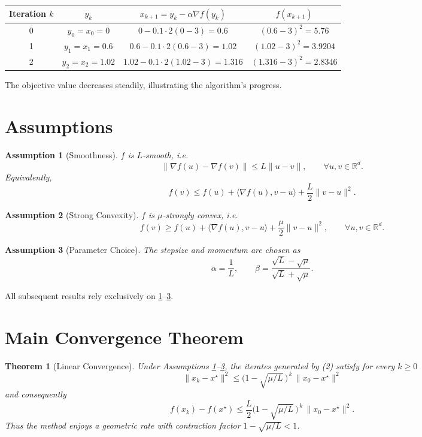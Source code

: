 \documentclass{article}
\newtheorem{theorem}{Theorem}
\newtheorem{assumption}{Assumption}
\begin{document}
\begin{center}
\begin{tabular}{c|c|c|c}
Iteration $k$ & $y_k$ & $x_{k+1}=y_k-\alpha\nabla f(y_k)$ & $f(x_{k+1})$ \\ \hline
0 & $y_0=x_0=0$ & $0-0.1\cdot 2(0-3)=0.6$ & $(0.6-3)^2=5.76$\\
1 & $y_1=x_1=0.6$ & $0.6-0.1\cdot 2(0.6-3)=1.02$ & $(1.02-3)^2=3.9204$\\
2 & $y_2=x_2=1.02$ & $1.02-0.1\cdot 2(1.02-3)=1.316$ & $(1.316-3)^2=2.8346$\\
\end{tabular}
\end{center}
The objective value decreases steadily, illustrating the algorithm’s progress.

\newpage
\section*{Assumptions}
\begin{assumption}[Smoothness]\label{as:smooth}
$f$ is $L$‑smooth, i.e.
\[
\|\nabla f(u)-\nabla f(v)\|\le L\|u-v\|,\qquad\forall u,v\in\mathbb{R}^d.
\tag{3}
\]
Equivalently,
\[
f(v)\le f(u)+\langle\nabla f(u),v-u\rangle+\frac{L}{2}\|v-u\|^2 .
\tag{4}
\]
\end{assumption}

\begin{assumption}[Strong Convexity]\label{as:strong}
$f$ is $\mu$‑strongly convex, i.e.
\[
f(v)\ge f(u)+\langle\nabla f(u),v-u\rangle+\frac{\mu}{2}\|v-u\|^2 ,
\qquad\forall u,v\in\mathbb{R}^d .
\tag{5}
\]
\end{assumption}

\begin{assumption}[Parameter Choice]\label{as:param}
The stepsize and momentum are chosen as
\[
\alpha=\frac{1}{L},\qquad 
\beta=\frac{\sqrt{L}-\sqrt{\mu}}{\sqrt{L}+\sqrt{\mu}} .
\tag{6}
\]
\end{assumption}

All subsequent results rely exclusively on \ref{as:smooth}–\ref{as:param}.

\section*{Main Convergence Theorem}
\begin{theorem}[Linear Convergence]\label{thm:linear}
Under Assumptions \ref{as:smooth}–\ref{as:param}, the iterates generated by (2) satisfy for every $k\ge0$
\[
\boxed{
\|x_k-x^\star\|^2\le\bigl(1-\sqrt{\mu/L}\,\bigr)^{\,k}\,\|x_0-x^\star\|^2
}
\tag{7}
\]
and consequently
\[
f(x_k)-f(x^\star)\le
\frac{L}{2}\bigl(1-\sqrt{\mu/L}\,\bigr)^{\,k}\,\|x_0-x^\star\|^2 .
\tag{8}
\]
Thus the method enjoys a geometric rate with contraction factor $1-\sqrt{\mu/L}<1$.
\end{theorem}
\end{document}
